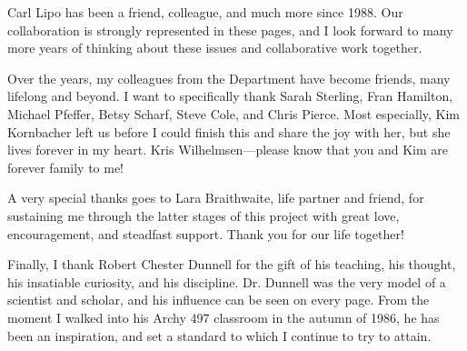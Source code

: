 \vskip 0.3cm

Carl Lipo has been a friend, colleague, and much more since 1988.  Our collaboration is strongly represented in these pages, and I look forward to many more years of thinking about these issues and collaborative work together.  

\vskip 0.3cm

Over the years, my colleagues from the Department have become friends, many lifelong and beyond.  I want to specifically thank Sarah Sterling, Fran Hamilton, Michael Pfeffer, Betsy Scharf, Steve Cole, and Chris Pierce.  Most especially, Kim Kornbacher left us before I could finish this and share the joy with her, but she lives forever in my heart.  Kris Wilhelmsen---please know that you and Kim are forever family to me!

\vskip 0.3cm

A very special thanks goes to Lara Braithwaite, life partner and friend, for sustaining me through the latter stages of this project with great love, encouragement, and steadfast support.  Thank you for our life together! 
\vskip 0.3cm

Finally, I thank Robert Chester Dunnell for the gift of his teaching, his thought, his insatiable curiosity, and his discipline.  Dr. Dunnell was the very model of a scientist and scholar, and his influence can be seen on every page.  From the moment I walked into his Archy 497 classroom in the autumn of 1986, he has been an inspiration, and set a standard to which I continue to try to attain.  








% 



\newpage
%